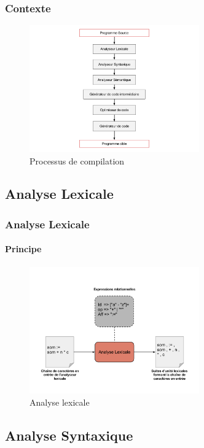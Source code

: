 \documentclass{beamer}
\begin{document}
\begin{frame}\frametitle{Contexte}

	\begin{figure}[h]
		\centering
			\includegraphics[width=0.65\textwidth]{compilation.png}
		\caption{Processus de compilation}
		\label{fig:compilation}
	\end{figure}\FloatBarrier

\end{frame}

\subsection{Analyse Lexicale}

\begin{frame}\frametitle{Analyse Lexicale}\framesubtitle{Principe}

	\begin{figure}[h]
		\centering
			\includegraphics[width=0.65\textwidth]{AnalyseLexicale.png}
		\caption{Analyse lexicale}
		\label{fig:AnalyseLexicale}
	\end{figure}\FloatBarrier

\end{frame}

\subsection{Analyse Syntaxique}
\end{document}
